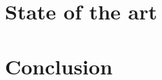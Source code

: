 \documentclass[paper=a4, fontsize=11pt]{scrartcl}
\begin{document}

\newpage


\newpage


\newpage


\newpage


\newpage

\renewcommand{\contentsname}{Table of contents}
\tableofcontents
\newpage


\newpage

\section{State of the art}

\section{Conclusion}

\printbibliography[heading=bibintoc, title={Bibliography}]
\newpage


\listoffigures

\listoftables


\end{document}

